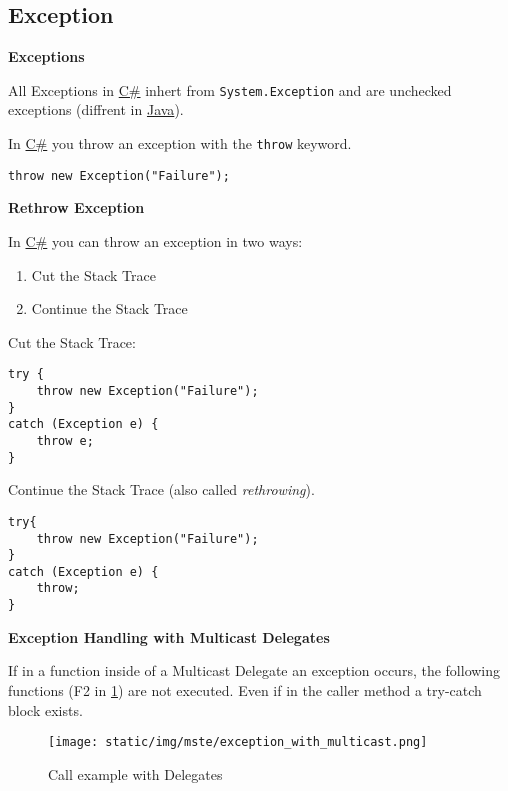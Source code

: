 \documentclass[11pt,twoside,landscape]{article}
\begin{document}
\begin{multicols}{3}
\section{Exception}
\label{sec:org1b5a6ea}

\textbf{Exceptions}

All Exceptions in \href{../../../roam/20211003114158-c.org}{C\#} inhert from \texttt{System.Exception} and are unchecked exceptions (diffrent in \href{../../../roam/20201116150053-java.org}{Java}).

In \href{../../../roam/20211003114158-c.org}{C\#} you throw an exception with the \texttt{throw} keyword.
\lstset{language=csharp,label= ,caption= ,captionpos=b,numbers=none}
\begin{lstlisting}
throw new Exception("Failure");
\end{lstlisting}

\textbf{Rethrow Exception}

In \href{../../../roam/20211003114158-c.org}{C\#} you can throw an exception in two ways:
\begin{enumerate}
\item Cut the Stack Trace
\item Continue the Stack Trace
\end{enumerate}

Cut the Stack Trace:
\lstset{language=csharp,label= ,caption= ,captionpos=b,numbers=none}
\begin{lstlisting}
try {
    throw new Exception("Failure");
}
catch (Exception e) {
    throw e;
}
\end{lstlisting}

Continue the Stack Trace (also called \emph{rethrowing}).
\lstset{language=csharp,label= ,caption= ,captionpos=b,numbers=none}
\begin{lstlisting}
try{
    throw new Exception("Failure");
}
catch (Exception e) {
    throw;
}
\end{lstlisting}

\textbf{Exception Handling with Multicast Delegates}

If in a function inside of a Multicast Delegate an exception occurs, the following functions (F2 in \ref{fig:org92edd4d}) are not executed.
Even if in the caller method a try-catch block exists.

\begin{figure}[htbp]
\centering
\texttt{[image: static/img/mste/exception\_with\_multicast.png]}
\caption{\label{fig:org92edd4d}Call example with Delegates}
\end{figure}


\end{multicols}
\end{document}
